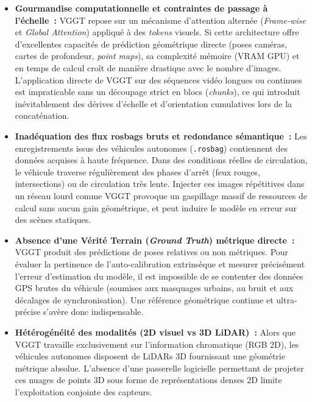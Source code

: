 \documentclass[12pt,a4paper,oneside]{report}
\begin{document}
\begin{itemize}
    \setlength{\itemsep}{1em}
    \renewcommand{\labelitemi}{{\large\bfseries\textbullet}}
    \item {\large\bfseries Gourmandise computationnelle et contraintes de passage à l'échelle~:} VGGT repose sur un mécanisme d'attention alternée (\textit{Frame-wise} et \textit{Global Attention}) appliqué à des \textit{tokens} visuels. Si cette architecture offre d'excellentes capacités de prédiction géométrique directe (poses caméras, cartes de profondeur, \textit{point maps}), sa complexité mémoire (VRAM GPU) et en temps de calcul croît de manière drastique avec le nombre d'images. L'application directe de VGGT sur des séquences vidéo longues ou continues est impraticable sans un découpage strict en blocs (\textit{chunks}), ce qui introduit inévitablement des dérives d'échelle et d'orientation cumulatives lors de la concaténation.
    
    \item {\large\bfseries Inadéquation des flux rosbags bruts et redondance sémantique~:} Les enregistrements issus des véhicules autonomes (\texttt{.rosbag}) contiennent des données acquises à haute fréquence. Dans des conditions réelles de circulation, le véhicule traverse régulièrement des phases d'arrêt (feux rouges, intersections) ou de circulation très lente. Injecter ces images répétitives dans un réseau lourd comme VGGT provoque un gaspillage massif de ressources de calcul sans aucun gain géométrique, et peut induire le modèle en erreur sur des scènes statiques.
    
    \item {\large\bfseries Absence d'une Vérité Terrain (\textit{Ground Truth}) métrique directe~:} VGGT produit des prédictions de poses relatives ou non métriques. Pour évaluer la pertinence de l'auto-calibration extrinsèque et mesurer précisément l'erreur d'estimation du modèle, il est impossible de se contenter des données GPS brutes du véhicule (soumises aux masquages urbains, au bruit et aux décalages de synchronisation). Une référence géométrique continue et ultra-précise s'avère donc indispensable.
    
    \item {\large\bfseries Hétérogénéité des modalités (2D visuel vs 3D LiDAR)~:} Alors que VGGT travaille exclusivement sur l'information chromatique (RGB 2D), les véhicules autonomes disposent de LiDARs 3D fournissant une géométrie métrique absolue. L'absence d'une passerelle logicielle permettant de projeter ces nuages de points 3D sous forme de représentations denses 2D limite l'exploitation conjointe des capteurs.
\end{itemize}
\end{document}
